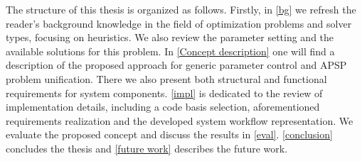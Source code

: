 The structure of this thesis is organized as follows. Firstly, in \cref{bg} we refresh the reader's background knowledge in the field of optimization problems and solver types, focusing on heuristics. We also review the parameter setting and the available solutions for this problem. In \cref{Concept description} one will find a description of the proposed approach for generic parameter control and APSP problem unification. There we also present both structural and functional requirements for system components. \cref{impl} is dedicated to the review of implementation details, including a code basis selection, aforementioned requirements realization and the developed system workflow representation. We evaluate the proposed concept and discuss the results in \cref{eval}. \cref{conclusion} concludes the thesis and \cref{future work} describes the future work.
